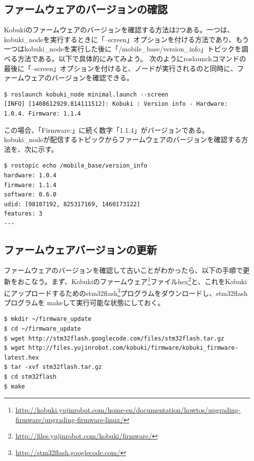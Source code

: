 \begin{itemize}
\subsection{ファームウェアのバージョンの確認}

Kobukiのファームウェアのバージョンを確認する方法は2つある。一つは、kobuki\_nodeを実行するときに「--screen」オプションを付ける方法であり、もう一つはkobuki\_nodeを実行した後に「/mobile\_base/version\_info」トピックを調べる方法である。以下で具体的にみてみよう。
次のようにroslaunchコマンドの最後に「--screen」オプションを付けると、ノードが実行されるのと同時に、ファームウェアのバージョンを確認できる。

\begin{lstlisting}[language=ROS]
$ roslaunch kobuki_node minimal.launch --screen
[INFO] [1408612929.814111512]: Kobuki : Version info - Hardware: 1.0.4. Firmware: 1.1.4
\end{lstlisting}

この場合、「Firmware:」に続く数字「1.1.4」がバージョンである。
kobuki\_nodeが配信するトピックからファームウェアのバージョンを確認する方法を、次に示す。

\begin{lstlisting}[language=ROS]
$ rostopic echo /mobile_base/version_info
hardware: 1.0.4
firmware: 1.1.4
software: 0.6.0
udid: [98107192, 825317169, 1460173122]
features: 3
---
\end{lstlisting}

\subsection{ファームウェアバージョンの更新}

ファームウェアのバージョンを確認して古いことがわかったら、以下の手順で更新をおこなう。まず、Kobukiのファームウェア\footnote{\url{http://kobuki.yujinrobot.com/home-en/documentation/howtos/upgrading-firmware/upgrading-firmware-linux/}}ファイルhex\footnote{\url{http://files.yujinrobot.com/kobuki/firmware/}}と、これをKobukiにアップロードするためのstm32flash\footnote{\url{http://stm32flash.googlecode.com/}}プログラムをダウンロードし、stm32flashプログラムを makeして実行可能な状態にしておく。

\begin{lstlisting}[language=ROS]
$ mkdir ~/firmware_update
$ cd ~/firmware_update
$ wget http://stm32flash.googlecode.com/files/stm32flash.tar.gz
$ wget http://files.yujinrobot.com/kobuki/firmware/kobuki_firmware-latest.hex
$ tar -xvf stm32flash.tar.gz
$ cd stm32flash
$ make
\end{lstlisting}


\end{itemize}
